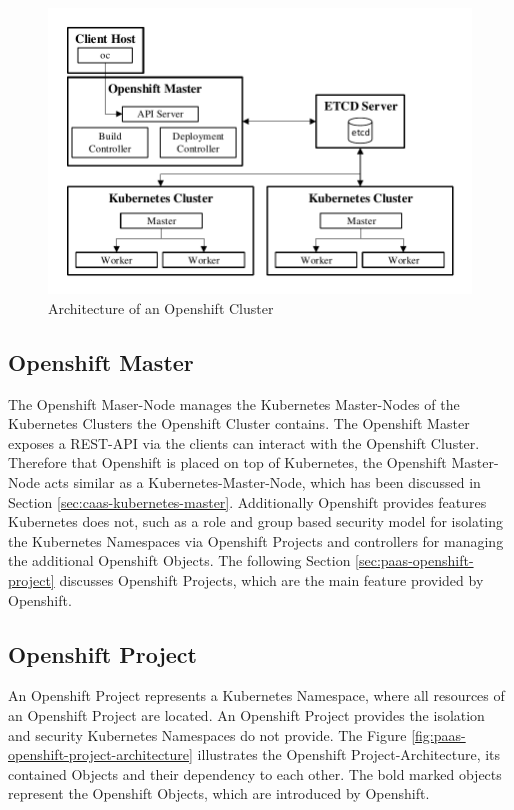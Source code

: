 \begin{figure}[htbp]
	\centering
	\includegraphics[scale=1]{images/openshift-kubernetes-cluster-architecture.pdf}
	\caption{Architecture of an Openshift Cluster}
	\label{fig:paas-openshift-kubernetes-cluster-architecture}
\end{figure} 

\subsection{Openshift Master}
\label{sec:paas-openshift-master}
The Openshift Maser-Node manages the Kubernetes Master-Nodes of the Kubernetes Clusters the Openshift Cluster contains. The Openshift Master exposes a REST-API via the clients can interact with the Openshift Cluster. Therefore that Openshift is placed on top of Kubernetes, the Openshift Master-Node acts similar as a Kubernetes-Master-Node, which has been discussed in Section \vref{sec:caas-kubernetes-master}. Additionally Openshift provides features Kubernetes does not, such as a role and group based security model for isolating the Kubernetes Namespaces via Openshift Projects and controllers for managing the additional Openshift Objects. The following Section \vref{sec:paas-openshift-project} discusses Openshift Projects, which are the main feature provided by Openshift.

\subsection{Openshift Project}
\label{sec:paas-openshift-project}
An Openshift Project represents a Kubernetes Namespace, where all resources of an Openshift Project are located. An Openshift Project provides the isolation and security Kubernetes Namespaces do not provide. The Figure \vref{fig:paas-openshift-project-architecture} illustrates the Openshift Project-Architecture, its contained Objects and their dependency to each other. The bold marked objects represent the Openshift Objects, which are introduced by Openshift.
\newpage

